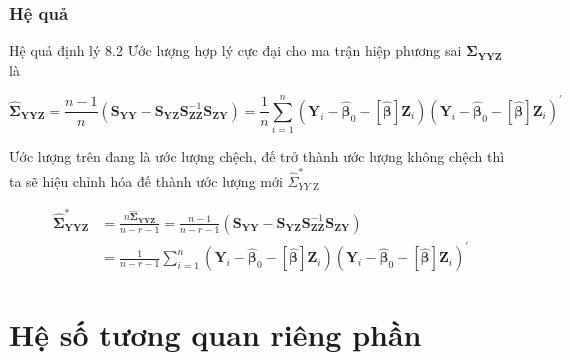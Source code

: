 \begin{frame}
\frametitle{Hệ quả}

\begin{block}{Hệ quả định lý 8.2}
Ước lượng hợp lý cực đại cho ma trận hiệp phương sai $\boldsymbol{\Sigma}_{\boldsymbol{Y} \boldsymbol{Y} \mathbf{Z}}$ là

$$
\widehat{\boldsymbol{\Sigma}}_{\boldsymbol{Y} \boldsymbol{Y} \boldsymbol{Z}}=\frac{n-1}{n}\left(\boldsymbol{S}_{\boldsymbol{Y} \boldsymbol{Y}}-\boldsymbol{S}_{\boldsymbol{Y} \boldsymbol{Z}} \boldsymbol{S}_{\mathbf{Z} \boldsymbol{Z}}^{-1} \boldsymbol{S}_{\mathbf{Z} \boldsymbol{Y}}\right)=\frac{1}{n} \sum_{i=1}^n\left(\boldsymbol{Y}_i-\widehat{\boldsymbol{\beta}}_0-[\widehat{\boldsymbol{\beta}}] \mathbf{Z}_i\right)\left(\boldsymbol{Y}_i-\widehat{\boldsymbol{\beta}}_0-[\widehat{\boldsymbol{\beta}}] \mathbf{Z}_i\right)^{\prime}
$$


Ước lượng trên đang là ước lượng chệch, đế trở thành ước lượng không chệch thì ta sẽ hiệu chỉnh hóa đế thành ước lượng mới $\widehat{\Sigma}_{Y Y \text { Z }}^*$

$$
\begin{aligned}
\widehat{\boldsymbol{\Sigma}}_{\boldsymbol{Y} \boldsymbol{Y} \mathbf{Z}}^* & =\frac{n \widehat{\boldsymbol{\Sigma}}_{\boldsymbol{Y} \boldsymbol{Y} \mathbf{Z}}}{n-r-1}=\frac{n-1}{n-r-1}\left(\boldsymbol{S}_{\boldsymbol{Y} \boldsymbol{Y}}-\boldsymbol{S}_{\boldsymbol{Y} 
\mathbf{Z}} \boldsymbol{S}_{\mathbf{Z} \mathbf{Z}}^{-1} \boldsymbol{S}_{\mathbf{Z} \boldsymbol{Y}}\right) \\
& =\frac{1}{n-r-1} \sum_{i=1}^n\left(\boldsymbol{Y}_i-\widehat{\boldsymbol{\beta}}_0-[\hat{\boldsymbol{\beta}}] \mathbf{Z}_i\right)\left(\boldsymbol{Y}_i-\widehat{\boldsymbol{\beta}}_0-[\hat{\boldsymbol{\beta}}] \mathbf{Z}_i\right)^{\prime}
\end{aligned}
$$
\end{block}
\end{frame}


\section{Hệ số tương quan riêng phần}

